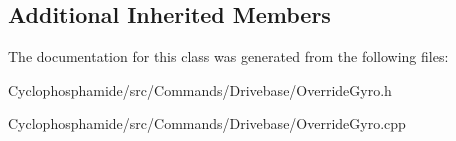 \subsection*{Additional Inherited Members}


The documentation for this class was generated from the following files\+:\begin{DoxyCompactItemize}
\item 
Cyclophosphamide/src/\+Commands/\+Drivebase/Override\+Gyro.\+h\item 
Cyclophosphamide/src/\+Commands/\+Drivebase/Override\+Gyro.\+cpp\end{DoxyCompactItemize}
